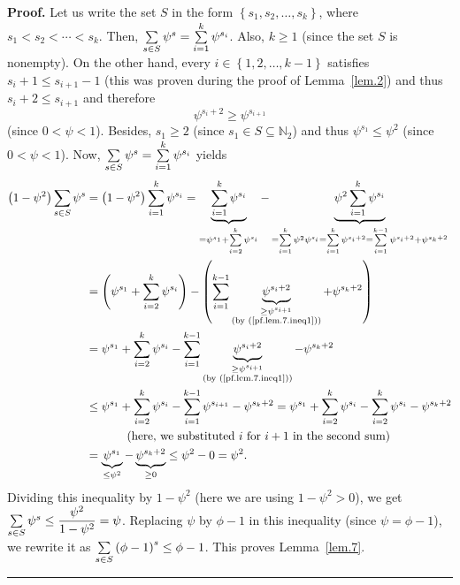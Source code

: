 \documentclass[numbers=enddot,12pt,final,onecolumn,notitlepage]{scrartcl}%
\numberwithin{exer}{section}
\theoremstyle{definition}
\newenvironment{proof}[1][Proof]{\noindent\textbf{#1.} }{\ \rule{0.5em}{0.5em}}
\let\sumnonlimits\sum
\renewcommand{\sum}{\sumnonlimits\limits}
\begin{document}
\begin{proof}
Let us write the set $S$ in the form $\left\{  s_{1},s_{2},\ldots
,s_{k}\right\}  $, where $s_{1}<s_{2}<\cdots<s_{k}$. Then, $\sum\limits_{s\in
S}\psi^{s}=\sum\limits_{i=1}^{k}\psi^{s_{i}}$. Also, $k\geq1$ (since the set
$S$ is nonempty). On the other hand, every $i\in\left\{  1,2,\ldots
,k-1\right\}  $ satisfies $s_{i}+1\leq s_{i+1}-1$ (this was proven during the
proof of Lemma~\ref{lem.2}) and thus $s_{i}+2\leq s_{i+1}$ and therefore%
\begin{equation}
\psi^{s_{i}+2}\geq\psi^{s_{i+1}} \label{pf.lem.7.ineq1}%
\end{equation}
(since $0<\psi<1$). Besides, $s_{1}\geq2$ (since $s_{1}\in S\subseteq
\mathbb{N}_{2}$) and thus $\psi^{s_{1}}\leq\psi^{2}$ (since $0<\psi<1$). Now,
$\sum\limits_{s\in S}\psi^{s}=\sum\limits_{i=1}^{k}\psi^{s_{i}}$ yields%
\begin{align*}
\left(  1-\psi^{2}\right)  \sum\limits_{s\in S}\psi^{s}  &  =\left(
1-\psi^{2}\right)  \sum\limits_{i=1}^{k}\psi^{s_{i}}=\underbrace{\sum
\limits_{i=1}^{k}\psi^{s_{i}}}_{=\psi^{s_{1}}+\sum\limits_{i=2}^{k}\psi
^{s_{i}}}-\underbrace{\psi^{2}\sum\limits_{i=1}^{k}\psi^{s_{i}}}%
_{=\sum\limits_{i=1}^{k}\psi^{2}\psi^{s_{i}}=\sum\limits_{i=1}^{k}\psi
^{s_{i}+2}=\sum\limits_{i=1}^{k-1}\psi^{s_{i}+2}+\psi^{s_{k}+2}}\\
&  =\left(  \psi^{s_{1}}+\sum\limits_{i=2}^{k}\psi^{s_{i}}\right)  -\left(
\sum\limits_{i=1}^{k-1}\underbrace{\psi^{s_{i}+2}}_{\substack{\geq
\psi^{s_{i+1}}\\\text{(by (\ref{pf.lem.7.ineq1}))}}}+\psi^{s_{k}+2}\right) \\
&  =\psi^{s_{1}}+\sum\limits_{i=2}^{k}\psi^{s_{i}}-\sum\limits_{i=1}%
^{k-1}\underbrace{\psi^{s_{i}+2}}_{\substack{\geq\psi^{s_{i+1}}\\\text{(by
(\ref{pf.lem.7.ineq1}))}}}-\psi^{s_{k}+2}\\
&  \leq\psi^{s_{1}}+\sum\limits_{i=2}^{k}\psi^{s_{i}}-\sum\limits_{i=1}%
^{k-1}\psi^{s_{i+1}}-\psi^{s_{k}+2}=\psi^{s_{1}}+\sum\limits_{i=2}^{k}%
\psi^{s_{i}}-\sum\limits_{i=2}^{k}\psi^{s_{i}}-\psi^{s_{k}+2}\\
&  \ \ \ \ \ \ \ \ \ \ \left(  \text{here, we substituted }i\text{ for
}i+1\text{ in the second sum}\right) \\
&  =\underbrace{\psi^{s_{1}}}_{\leq\psi^{2}}-\underbrace{\psi^{s_{k}+2}}%
_{\geq0}\leq\psi^{2}-0=\psi^{2}.
\end{align*}
Dividing this inequality by $1-\psi^{2}$ (here we are using $1-\psi^{2}>0$),
we get $\sum\limits_{s\in S}\psi^{s}\leq\dfrac{\psi^{2}}{1-\psi^{2}}=\psi$.
Replacing $\psi$ by $\phi-1$ in this inequality (since $\psi=\phi-1$), we
rewrite it as $\sum\limits_{s\in S}\left(  \phi-1\right)  ^{s}\leq\phi-1$.
This proves Lemma~\ref{lem.7}.
\end{proof}
\end{document}

